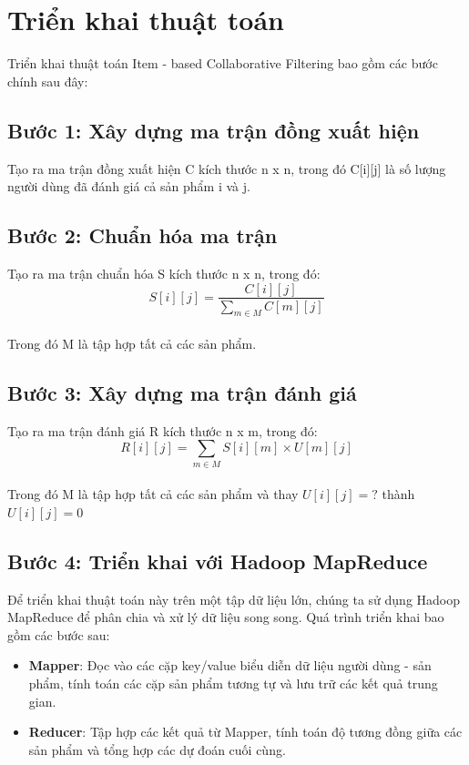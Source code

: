 \documentclass{report}
\begin{document}
\section{Triển khai thuật toán}
Triển khai thuật toán Item - based Collaborative Filtering
bao gồm các bước chính sau đây:

\subsection*{Bước 1: Xây dựng ma trận đồng xuất hiện}
Tạo ra ma trận đồng xuất hiện C kích thước n x n, trong đó
C[i][j] là số lượng người dùng đã đánh giá cả sản phẩm i và j.

\subsection*{Bước 2: Chuẩn hóa ma trận}
Tạo ra ma trận chuẩn hóa S kích thước n x n, trong đó: \\
$$S[i][j] = \frac{C[i][j]}{\sum_{m \in M}C[m][j]}$$ \\
Trong đó M là tập hợp tất cả các sản phẩm.

\subsection*{Bước 3: Xây dựng ma trận đánh giá}
Tạo ra ma trận đánh giá R kích thước n x m, trong đó: \\
$$R[i][j] = \sum_{m \in M}S[i][m] \times U[m][j]$$ \\
Trong đó M là tập hợp tất cả các sản phẩm và thay $U[i][j]=?$ thành $U[i][j]=0$

\subsection*{Bước 4: Triển khai với Hadoop MapReduce}
Để triển khai thuật toán này trên một tập dữ liệu lớn, chúng ta sử dụng
Hadoop MapReduce để phân chia và xử lý dữ liệu song song. Quá trình triển khai
bao gồm các bước sau:
\begin{itemize}
    \item \textbf{Mapper}: Đọc vào các cặp key/value biểu diễn dữ liệu
          người dùng - sản phẩm, tính toán các cặp sản phẩm tương tự và
          lưu trữ các kết quả trung gian.
    \item \textbf{Reducer}: Tập hợp các kết quả từ Mapper, tính toán
          độ tương đồng giữa các sản phẩm và tổng hợp các dự đoán cuối cùng.
\end{itemize}
\end{document}

